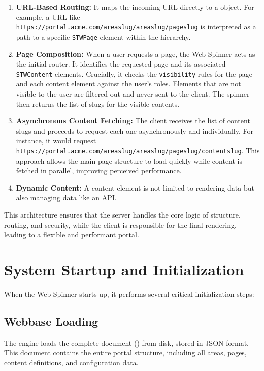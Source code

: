 \begin{enumerate}
	\item \textbf{URL-Based Routing:} It maps the incoming URL directly to a \webbase{} object. For example, a URL like \texttt{https://portal.acme.com/areaslug/areaslug/pageslug} is interpreted as a path to a specific \texttt{STWPage} element within the \webbase{} hierarchy.

	\item \textbf{Page Composition:} When a user requests a page, the Web Spinner acts as the initial router. It identifies the requested page and its associated \texttt{STWContent} elements. Crucially, it checks the \texttt{visibility} rules for the page and each content element against the user's roles. Elements that are not visible to the user are filtered out and never sent to the client. The spinner then returns the list of slugs for the visible contents.

	\item \textbf{Asynchronous Content Fetching:} The client receives the list of content slugs and proceeds to request each one asynchronously and individually. For instance, it would request \texttt{https://portal.acme.com/areaslug/areaslug/pageslug/contentslug}. This approach allows the main page structure to load quickly while content is fetched in parallel, improving perceived performance.

	\item \textbf{Dynamic Content:} A content element is not limited to rendering data but also managing data like an API.
\end{enumerate}

This architecture ensures that the server handles the core logic of structure, routing, and security, while the client is responsible for the final rendering, leading to a flexible and performant portal.

\section{System Startup and Initialization}
\label{sec:system-startup}

When the Web Spinner starts up, it performs several critical initialization steps:

\subsection{Webbase Loading}

The engine loads the complete \wbdl{} document (\webbase{}) from disk, stored in JSON format. This document contains the entire portal structure, including all areas, pages, content definitions, and configuration data.


